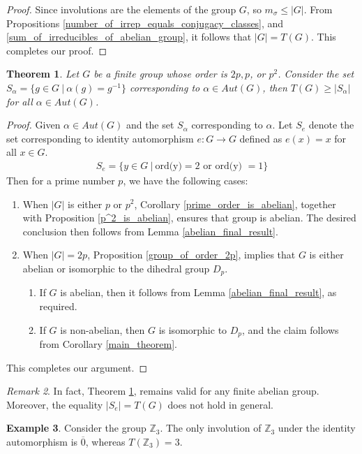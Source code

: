 \documentclass{amsart}
\newtheorem{theorem}{Theorem}[section]
\theoremstyle{definition}
\newtheorem{example}[theorem]{Example}
\theoremstyle{remark}
\newtheorem{remark}[theorem]{Remark}
\newcommand{\Aut}{Aut}
\numberwithin{equation}{section}
\begin{document}
        \begin{proof}
            Since involutions are the elements of the group $G$, so $m_{\sigma} \leq |G|$. From Propositions \ref{number_of_irrep_equals_conjugacy_classes}, and \ref{sum_of_irreducibles_of_abelian_group}, it follows that $|G| = T(G)$. This completes our proof.
        \end{proof}
        \begin{theorem}\label{final_theorem}
            Let $G$ be a finite group whose order is $2p, p$, or $p^2$. Consider the set $S_{\alpha} = \{g \in G \ | \ \alpha(g) = g^{-1}\}$ corresponding to $\alpha \in \Aut(G)$, then $T(G) \geq |S_{\alpha}|$ for all $\alpha \in \Aut(G)$.
        \end{theorem}
        \begin{proof}
            Given $\alpha \in \Aut(G)$ and the set $S_{\alpha}$ corresponding to $\alpha$. Let $S_e$ denote
            the set corresponding to identity automorphism $e : G \rightarrow G$ defined as $e(x) = x $ for all $x \in G$.
            \begin{align*}
                S_e = \{y \in G \ | \ \text{ord(y)} = 2  \text{ or } \text{ord(y) } = 1\} 
            \end{align*} Then for a prime number $p$, we have the following cases:
            \begin{enumerate}
                \item[Case (i).] When $|G|$ is either $p$ or $p^2$, Corollary \ref{prime_order_is_abelian}, together with Proposition \ref{p^2_is_abelian}, ensures that group is abelian. The desired conclusion then follows from Lemma \ref{abelian_final_result}.
                \item[Case (ii).] When $ |G| = 2p$, Proposition \ref{group_of_order_2p}, implies that $G$ is either abelian or isomorphic to the dihedral group $D_p$.
                \begin{enumerate}
                	\item If $G$ is abelian, then it follows from Lemma \ref{abelian_final_result}, as required.
                	\item If $G$ is non-abelian, then $G$ is isomorphic to $D_p$, and the claim follows from Corollary \ref{main_theorem}.
            	\end{enumerate}
            \end{enumerate}
            This completes our argument.
        \end{proof}
        \begin{remark}
            In fact, Theorem \ref{final_theorem}, remains valid for any finite abelian group. Moreover, the equality $|S_e| = T(G)$ does not hold in general.
        \end{remark}    \begin{example}
            Consider the group $\mathbb{Z}_3$. The only involution of $\mathbb{Z}_3$ under the identity automorphism is $\overline{0}$, whereas $T(\mathbb{Z}_3) = 3$.
        \end{example}

        
        
        
\end{document}
